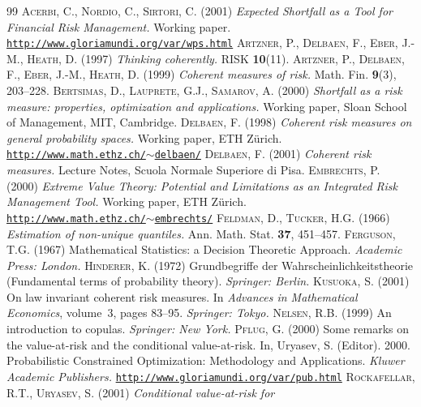 \documentclass[11pt,a4paper,leqno]{article}
\begin{document}
{%
\sloppy
\begin{thebibliography}{99}
 \textsc{Acerbi, C., Nordio, C., Sirtori, C. (2001)} \emph{Expected Shortfall as
a Tool for Financial Risk Management.} Working paper.
\href{http://www.gloriamundi.org/var/wps.html}{\tt http://www.gloriamundi.org/var/wps.html}
%
 \textsc{Artzner, P., Delbaen, F., Eber, J.-M., Heath, D. (1997)} \emph{Thinking
coherently.} RISK \textbf{10}(11).
%
 \textsc{Artzner, P., Delbaen, F., Eber, J.-M., Heath, D. (1999)} 
\emph{Coherent measures of risk.} Math. Fin. \textbf{9}(3), 203--228.
%
 \textsc{Bertsimas, D., Lauprete, G.J., Samarov, A. (2000)}
\emph{Shortfall as a risk measure: properties, optimization and applications.} 
Working paper, Sloan School of Management, MIT, Cambridge.
%
 \textsc{Delbaen, F. (1998)} \emph{Coherent risk measures on general
probability spaces.} Working paper, ETH Z\"urich.
\href{http://www.math.ethz.ch/~delbaen/}{\tt http://www.math.ethz.ch/$\sim$delbaen/}
%
 \textsc{Delbaen, F. (2001)} \emph{Coherent risk measures.} Lecture Notes, 
Scuola Normale Superiore di Pisa.
%
 \textsc{Embrechts, P. (2000)} \emph{Extreme Value Theory: Potential
and Limitations as an Integrated Risk Management Tool.} Working paper, ETH Z\"urich.\\
\href{http://www.math.ethz.ch/~embrechts/}{\tt http://www.math.ethz.ch/$\sim$embrechts/}
%
 \textsc{Feldman, D., Tucker, H.G. (1966)} \emph{Estimation of non-unique quantiles.}
Ann. Math. Stat. \textbf{37}, 451--457.
%
 \textsc{Ferguson, T.G. (1967)} Mathematical Statistics: a Decision Theoretic Approach.
\emph{Academic Press: London.}
%
 \textsc{Hinderer, K. (1972)} Grundbegriffe der Wahrscheinlichkeitstheorie
(Fundamental terms of probability theory).
\emph{Springer: Berlin.}
%
 \textsc{Kusuoka, S. (2001)} On law invariant coherent risk measures.
\newblock In {\em Advances in Mathematical Economics}, volume~3, pages 83--95.
\emph{Springer: Tokyo.}
%
 \textsc{Nelsen, R.B. (1999)} An introduction to copulas. \emph{Springer: New York.}
%
 \textsc{Pflug, G. (2000)} Some remarks on the value-at-risk
and the conditional value-at-risk. In, Uryasev, S.
(Editor). 2000. Probabilistic Constrained Optimization: Methodology and Applications. \emph{Kluwer Academic
Publishers.}
\href{http://www.gloriamundi.org/var/pub.html}{\tt http://www.gloriamundi.org/var/pub.html}
%
 \textsc{Rockafellar, R.T., Uryasev, S. (2001)} \emph{Conditional value-at-risk for
}
\end{thebibliography}}
\end{document}
